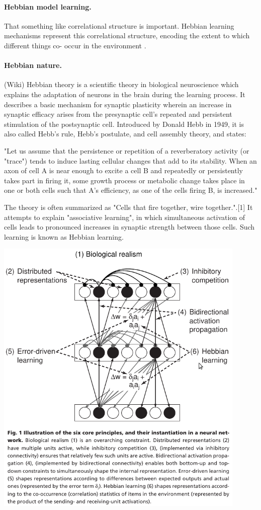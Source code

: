 \paragraph{Hebbian model learning.} That something like correlational structure is important.
Hebbian learning mechanisms represent this correlational
structure, encoding the extent to which different things co-
occur in the environment \cite{hinton1988learning}.


\paragraph{Hebbian nature.}

(Wiki) Hebbian theory is a scientific theory in biological neuroscience which explains the adaptation of neurons in the brain during the learning process. It describes a basic mechanism for synaptic plasticity wherein an increase in synaptic efficacy arises from the presynaptic cell's repeated and persistent stimulation of the postsynaptic cell. Introduced by Donald Hebb in 1949, it is also called Hebb's rule, Hebb's postulate, and cell assembly theory, and states:

    "Let us assume that the persistence or repetition of a reverberatory activity (or "trace") tends to induce lasting cellular changes that add to its stability. When an axon of cell A is near enough to excite a cell B and repeatedly or persistently takes part in firing it, some growth process or metabolic change takes place in one or both cells such that A's efficiency, as one of the cells firing B, is increased."

The theory is often summarized as "Cells that fire together, wire together.".[1] It attempts to explain "associative learning", in which simultaneous activation of cells leads to pronounced increases in synaptic strength between those cells. Such learning is known as Hebbian learning.

\includegraphics[width=12cm]{img/bio_plausability_o1998six.png}
